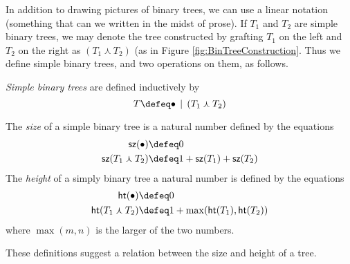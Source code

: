 In addition to drawing pictures of binary trees, we can use a linear notation (something that can we written 
in the midst of prose). 
If $T_1$ and $T_2$ are simple binary trees, we may denote the tree constructed by grafting $T_1$ on the left and $T_2$ on the right
as $(T_1\curlywedge T_2)$ (as in Figure \ref{fig:BinTreeConstruction}. Thus we define simple binary trees, and two operations
on them, as follows.

\begin{defn}
\emph{Simple binary trees} are defined inductively by
\[T \defeq \bullet \,\mid\, (T_1\curlywedge T_2)\]
\end{defn}

The \emph{size} of a simple binary tree is a natural number defined by the equations
\begin{align*}
  \sz(\bullet) &\defeq 0\\
  \sz(T_1\curlywedge T_2) &\defeq 1 + \sz(T_1) + \sz(T_2)
\end{align*}
The \emph{height} of a simply binary tree a natural number is defined
by the equations
\begin{align*}
  \hght(\bullet) &\defeq 0\\
  \hght(T_1\curlywedge T_2) &\defeq 1 + \max(\hght(T_1),\hght(T_2))
\end{align*}
where $\max(m,n)$ is the larger of the two numbers.

These definitions suggest a relation between the size and height of a tree.
\ipadbreak

